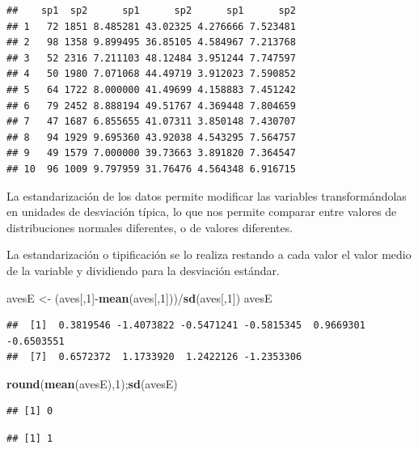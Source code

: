 \documentclass[]{book}
\newenvironment{Shaded}{\begin{snugshade}}{\end{snugshade}}
\newcommand{\KeywordTok}[1]{\textcolor[rgb]{0.13,0.29,0.53}{\textbf{{#1}}}}
\newcommand{\DecValTok}[1]{\textcolor[rgb]{0.00,0.00,0.81}{{#1}}}
\newcommand{\StringTok}[1]{\textcolor[rgb]{0.31,0.60,0.02}{{#1}}}
\newcommand{\NormalTok}[1]{{#1}}
\begin{document}
\begin{verbatim}
##    sp1  sp2      sp1      sp2      sp1      sp2
## 1   72 1851 8.485281 43.02325 4.276666 7.523481
## 2   98 1358 9.899495 36.85105 4.584967 7.213768
## 3   52 2316 7.211103 48.12484 3.951244 7.747597
## 4   50 1980 7.071068 44.49719 3.912023 7.590852
## 5   64 1722 8.000000 41.49699 4.158883 7.451242
## 6   79 2452 8.888194 49.51767 4.369448 7.804659
## 7   47 1687 6.855655 41.07311 3.850148 7.430707
## 8   94 1929 9.695360 43.92038 4.543295 7.564757
## 9   49 1579 7.000000 39.73663 3.891820 7.364547
## 10  96 1009 9.797959 31.76476 4.564348 6.916715
\end{verbatim}

La estandarización de los datos permite modificar las variables
transformándolas en unidades de desviación típica, lo que nos permite
comparar entre valores de distribuciones normales diferentes, o de
valores diferentes.

La estandarización o tipificación se lo realiza restando a cada valor el
valor medio de la variable y dividiendo para la desviación estándar.

\begin{Shaded}
\begin{Highlighting}[]
\NormalTok{avesE <-}\StringTok{ }\NormalTok{(aves[,}\DecValTok{1}\NormalTok{]-}\KeywordTok{mean}\NormalTok{(aves[,}\DecValTok{1}\NormalTok{]))/}\KeywordTok{sd}\NormalTok{(aves[,}\DecValTok{1}\NormalTok{])}
\NormalTok{avesE}
\end{Highlighting}
\end{Shaded}

\begin{verbatim}
##  [1]  0.3819546 -1.4073822 -0.5471241 -0.5815345  0.9669301 -0.6503551
##  [7]  0.6572372  1.1733920  1.2422126 -1.2353306
\end{verbatim}

\begin{Shaded}
\begin{Highlighting}[]
\KeywordTok{round}\NormalTok{(}\KeywordTok{mean}\NormalTok{(avesE),}\DecValTok{1}\NormalTok{);}\KeywordTok{sd}\NormalTok{(avesE) }
\end{Highlighting}
\end{Shaded}

\begin{verbatim}
## [1] 0
\end{verbatim}

\begin{verbatim}
## [1] 1
\end{verbatim}
\end{document}
